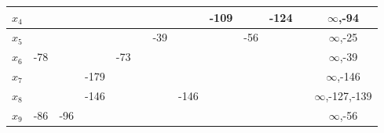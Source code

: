 \documentclass[12pt]{article}
\begin{document}
\begin{enumerate}
\begin{tabular}{|c|c|c|c|c|c|c|c|c|c|c|c|c|}
$x_{4}$  & {\color[HTML]{000000} }         & {\color[HTML]{FE0000} }         & {\color[HTML]{000000} }         & {\color[HTML]{000000} }         & {\color[HTML]{000000} }         & {\color[HTML]{000000} }         & {\color[HTML]{000000} }         & {\color[HTML]{000000} -109}     & {\color[HTML]{000000} }         & {\color[HTML]{FE0000} -124}     &          & {\color[HTML]{000000} $\infty$,-94}       \\ \hline
$x_{5}$  & {\color[HTML]{000000} }         & {\color[HTML]{000000} }         & {\color[HTML]{000000} }         & {\color[HTML]{000000} }         & {\color[HTML]{000000} }         & {\color[HTML]{FE0000} -39}      & {\color[HTML]{000000} }         & {\color[HTML]{000000} }         & {\color[HTML]{FE0000} -56}      & {\color[HTML]{000000} }         &          & {\color[HTML]{000000} $\infty$,-25}       \\ \hline
$x_{6}$  & {\color[HTML]{000000} -78}      & {\color[HTML]{000000} }         & {\color[HTML]{000000} }         & {\color[HTML]{000000} -73}      & {\color[HTML]{333333} }         & {\color[HTML]{000000} }         & {\color[HTML]{000000} }         & {\color[HTML]{000000} }         & {\color[HTML]{FE0000} }         & {\color[HTML]{000000} }         &          & {\color[HTML]{000000} $\infty$,-39}       \\ \hline
$x_{7}$  & {\color[HTML]{000000} }         & {\color[HTML]{000000} }         & {\color[HTML]{FE0000} -179}     & {\color[HTML]{FE0000} }         & {\color[HTML]{333333} }         & {\color[HTML]{000000} }         & {\color[HTML]{000000} }         & {\color[HTML]{000000} }         & {\color[HTML]{000000} }         & {\color[HTML]{000000} }         &          & {\color[HTML]{000000} $\infty$,-146}      \\ \hline
$x_{8}$  & {\color[HTML]{000000} }         & {\color[HTML]{000000} }         & {\color[HTML]{000000} -146}     & {\color[HTML]{000000} }         & {\color[HTML]{333333} }         & {\color[HTML]{000000} }         & {\color[HTML]{FE0000} -146}     & {\color[HTML]{000000} }         & {\color[HTML]{000000} }         & {\color[HTML]{000000} }         &          & {\color[HTML]{000000} $\infty$,-127,-139} \\ \hline
$x_{9}$  & {\color[HTML]{FE0000} -86}      & {\color[HTML]{000000} -96}      & {\color[HTML]{FE0000} }         & {\color[HTML]{000000} }         & {\color[HTML]{333333} }         & {\color[HTML]{000000} }         & {\color[HTML]{000000} }         & {\color[HTML]{000000} }         & {\color[HTML]{000000} }         & {\color[HTML]{FE0000} }         &          & {\color[HTML]{000000} $\infty$,-56}       \\ \hline

\end{tabular}
\end{enumerate}
\end{document}
